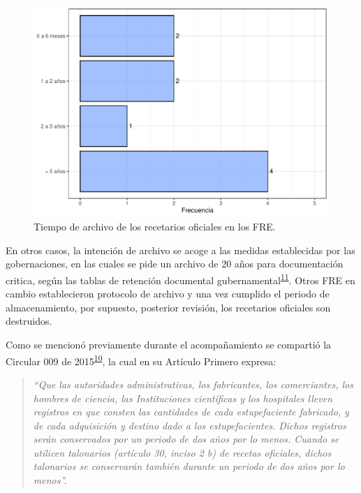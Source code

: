 \documentclass[
]{book}
\begin{document}
\begin{figure}

{\centering \includegraphics[width=0.85\linewidth]{InformeFinal_files/figure-latex/TiempoArchivoRecetariosOficiales-1} 

}

\caption{Tiempo de archivo de los recetarios oficiales en los FRE.}\label{fig:TiempoArchivoRecetariosOficiales}
\end{figure}

En otros casos, la intención de archivo se acoge a las medidas establecidas por las gobernaciones, en las cuales se pide un archivo de 20 años para documentación critica, según las tablas de retención documental gubernamental\textsuperscript{\protect\hyperlink{ref-PresidenciadelaRepublicadeColombia2012}{11}}. Otros FRE en cambio establecieron protocolo de archivo y una vez cumplido el periodo de almacenamiento, por supuesto, posterior revisión, los recetarios oficiales son destruidos.

Como se mencionó previamente durante el acompañamiento se compartió la Circular 009 de 2015\textsuperscript{\protect\hyperlink{ref-FNE2015-9}{10}}, la cual en su Artículo Primero expresa:

\begin{quote}
\emph{``Que las autoridades administrativas, los fabricantes, los comerciantes, los hombres de ciencia, las Instituciones científicas y los hospitales lleven registros en que consten las cantidades de cada estupefaciente fabricado, y de cada adquisición y destino dado a los estupefacientes. Dichos registros serán conservados por un periodo de dos años por lo menos. Cuando se utilicen talonarios (artículo 30, inciso 2 b) de recetas oficiales, dichos talonarios se conservarán también durante un periodo de dos años por lo menos''.}
\end{quote}
\end{document}
